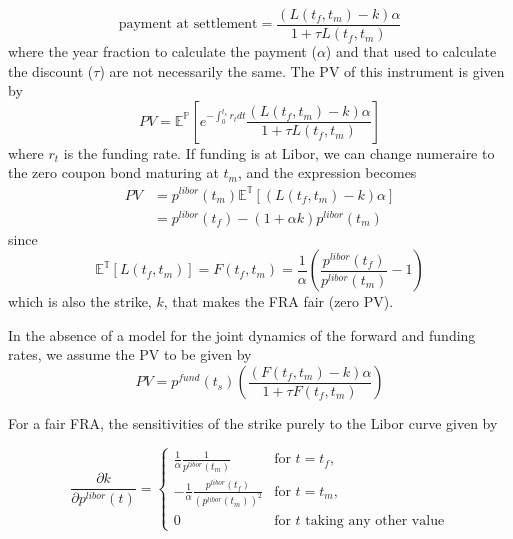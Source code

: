 \begin{equation}
\text{payment at settlement} = \frac{(L(t_f,t_m)-k)\alpha}{1+\tau L(t_f,t_m)}
\end{equation}
%
where the year fraction to calculate the payment ($\alpha$) and that used to calculate the discount ($\tau$) are not necessarily the same.  The PV of this instrument is given by
\begin{equation}
PV = \mathbb{E}^\mathbb{P}\left[e^{-\int^{t_s}_0 r_t dt} \frac{(L(t_f,t_m)-k)\alpha}{1+\tau L(t_f,t_m)}\right]
\end{equation}
%
where $r_t$ is the funding rate. If funding is at Libor, we can change numeraire to the zero coupon bond maturing at $t_m$, and the expression becomes 
\begin{equation}
\begin{split}
PV &=p^{libor}(t_m) \mathbb{E}^\mathbb{T}\left[(L(t_f,t_m)-k)\alpha\right] \\
&= p^{libor}(t_{f}) -(1+\alpha k) p^{libor}(t_m)
\end{split}
\end{equation}
%
since 
\begin{equation}
\mathbb{E}^\mathbb{T}\left[ L(t_f,t_m)\right] = F(t_f,t_m)= \frac{1}{\alpha}\left(\frac{p^{libor}(t_{f})} {p^{libor}(t_m)} -1\right)
\end{equation}
which is also the strike, $k$, that makes the FRA fair (zero PV).  
 
 In the absence of a model for the joint dynamics of the forward and funding rates, we assume the PV to be given by
 \begin{equation}
 \label{eqn:FRA_PV}
PV = p^{fund}(t_s)\left(\frac{(F(t_f,t_m)-k)\alpha}{1+\tau F(t_f,t_m)}\right)
\end{equation}


For a fair FRA, the sensitivities of the strike purely to the Libor curve given by

\begin{equation}
\frac{\partial k}{\partial p^{libor}(t)}=
\begin{cases}
 \frac{1}{\alpha}\frac{1} {p^{libor}(t_m)}& \text{for } t=t_{f},\\
 - \frac{1}{\alpha }\frac{p^{libor}(t_{f})} {\left(p^{libor}(t_m)\right)^2}& \text{for } t=t_{m},\\
 0 & \text{for $t$ taking any other value}
 \end{cases}
\end{equation}

